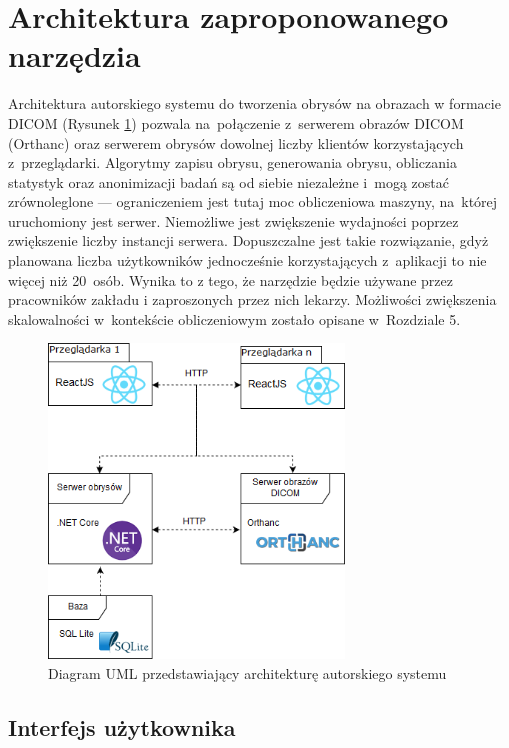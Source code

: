 \documentclass[a4paper,11pt,twoside,openright]{report}
\theoremstyle{definition}
\begin{document}
\section {Architektura zaproponowanego narzędzia}

Architektura autorskiego systemu do tworzenia obrysów na obrazach w formacie DICOM
(Rysunek \ref{fig:architektura}) pozwala na~połączenie z~serwerem obrazów DICOM (Orthanc) oraz serwerem
obrysów dowolnej liczby klientów korzystających z~przeglądarki. Algorytmy zapisu
obrysu, generowania obrysu, obliczania statystyk oraz anonimizacji badań są od
siebie niezależne i~mogą zostać zrównoleglone --- ograniczeniem jest tutaj moc
obliczeniowa maszyny, na~której uruchomiony jest serwer. Niemożliwe jest zwiększenie
wydajności poprzez zwiększenie liczby instancji serwera. Dopuszczalne jest takie
rozwiązanie, gdyż planowana liczba użytkowników jednocześnie korzystających z~aplikacji
to nie więcej niż 20~osób. Wynika to z tego, że narzędzie będzie używane przez pracowników
zakładu i zaproszonych przez nich lekarzy. Możliwości zwiększenia skalowalności w~kontekście
obliczeniowym zostało opisane w~Rozdziale 5.

\begin{figure}[t]
	\center
	\includegraphics[width=0.7\textwidth]{architektura}
	\caption{Diagram UML przedstawiający architekturę autorskiego systemu}
    	\label{fig:architektura}
\end{figure}

\subsection {Interfejs użytkownika}
\end{document}
